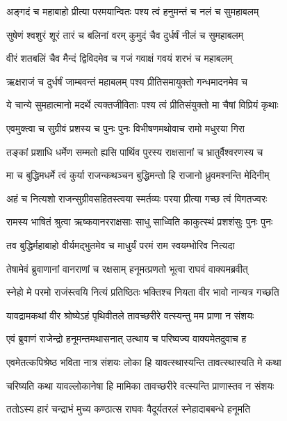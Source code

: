 \twolineshloka
{अङ्गदं च महाबाहो प्रीत्या परमयान्वितः}
{पश्य त्वं हनुमन्तं च नलं च सुमहाबलम्} %

\twolineshloka
{सुषेणं श्वशुरं शूरं तारं च बलिनां वरम्}
{कुमुदं चैव दुर्धर्षं नीलं च सुमहाबलम्} %

\twolineshloka
{वीरं शतबलिं चैव मैन्दं द्विविदमेव च}
{गजं गवाक्षं गवयं शरभं च महाबलम्} %

\twolineshloka
{ऋक्षराजं च दुर्धर्षं जाम्बवन्तं महाबलम्}
{पश्य प्रीतिसमायुक्तो गन्धमादनमेव च} %

\twolineshloka
{ये चान्ये सुमहात्मानो मदर्थे त्यक्तजीविताः}
{पश्य त्वं प्रीतिसंयुक्तो मा चैषां विप्रियं कृथाः} %

\twolineshloka
{एवमुक्त्वा च सुग्रीवं प्रशस्य च पुनः पुनः}
{विभीषणमथोवाच रामो मधुरया गिरा} %

\twolineshloka
{तङ्कां प्रशाधि धर्मेण सम्मतो ह्यसि पार्थिव}
{पुरस्य राक्षसानां च भ्रातुर्वैश्वरणस्य च} %

\twolineshloka
{मा च बुद्धिमधर्मे त्वं कुर्या राजन्कथञ्चन}
{बुद्धिमन्तो हि राजानो ध्रुवमश्नन्ति मेदिनीम्} %

\twolineshloka
{अहं च नित्यशो राजन्सुग्रीवसहितस्त्वया}
{स्मर्तव्यः परया प्रीत्या गच्छ त्वं विगतज्वरः} %

\twolineshloka
{रामस्य भाषितं श्रुत्वा ऋष्कवानरराक्षसाः}
{साधु साध्विति काकुत्स्थं प्रशशंसुः पुनः पुनः} %

\twolineshloka
{तव बुद्धिर्महाबाहो वीर्यमद्भुतमेव च}
{माधुर्यं परमं राम स्वयम्भोरिव नित्यदा} %

\twolineshloka
{तेषामेवं ब्रुवाणानां वानराणां च रक्षसाम्}
{हनूमत्प्रणतो भूत्वा राघवं वाक्यमब्रवीत्} %

\twolineshloka
{स्नेहो मे परमो राजंस्त्वयि नित्यं प्रतिष्ठितः}
{भक्तिश्च नियता वीर भावो नान्यत्र गच्छति} %

\twolineshloka
{यावद्रामकथां वीर श्रोष्येऽहं पृथिवीतले}
{तावच्छरीरे वत्स्यन्तु मम प्राणा न संशयः} %

\twolineshloka
{एवं ब्रुवाणं राजेन्द्रो हनूमन्तमथासनात्}
{उत्थाय च परिष्वज्य वाक्यमेतदुवाच ह} %

\twolineshloka
{एवमेतत्कपिश्रेष्ठ भविता नात्र संशयः}
{लोका हि यावत्स्थास्यन्ति तावत्स्थास्यति मे कथा} %

\twolineshloka
{चरिष्यति कथा यावल्लोकानेषा हि मामिका}
{तावच्छरीरे वत्स्यन्ति प्राणास्तव न संशयः} %

\twolineshloka
{ततोऽस्य हारं चन्द्राभं मुच्य कण्ठात्स राघवः}
{वैदूर्यतरलं स्नेहादाबबन्धे हनूमति} %

